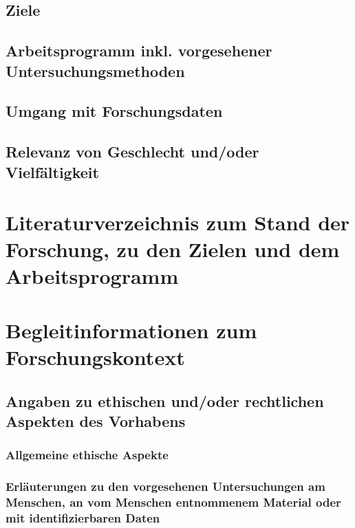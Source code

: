 \documentclass[de]{dfg-proposal}
\begin{document}
        \subsection{Ziele}

        \subsection{Arbeitsprogramm inkl. vorgesehener Untersuchungsmethoden}

        \subsection{Umgang mit Forschungsdaten}

        \subsection{Relevanz von Geschlecht und/oder Vielfältigkeit}


    \section{Literaturverzeichnis zum Stand der Forschung, zu den Zielen und dem Arbeitsprogramm}\label{sec:literaturverzeichnis}

        \printbibliography

        \partbreak


    \section{Begleitinformationen zum Forschungskontext}\label{sec:begleitinformationen-zum-forschungskontext}

        \subsection{Angaben zu ethischen und/oder rechtlichen Aspekten des Vorhabens}

            \subsubsection{Allgemeine ethische Aspekte}

            \subsubsection{Erläuterungen zu den vorgesehenen Untersuchungen am Menschen, an vom Menschen entnommenem Material oder mit identifizierbaren Daten}
\end{document}
